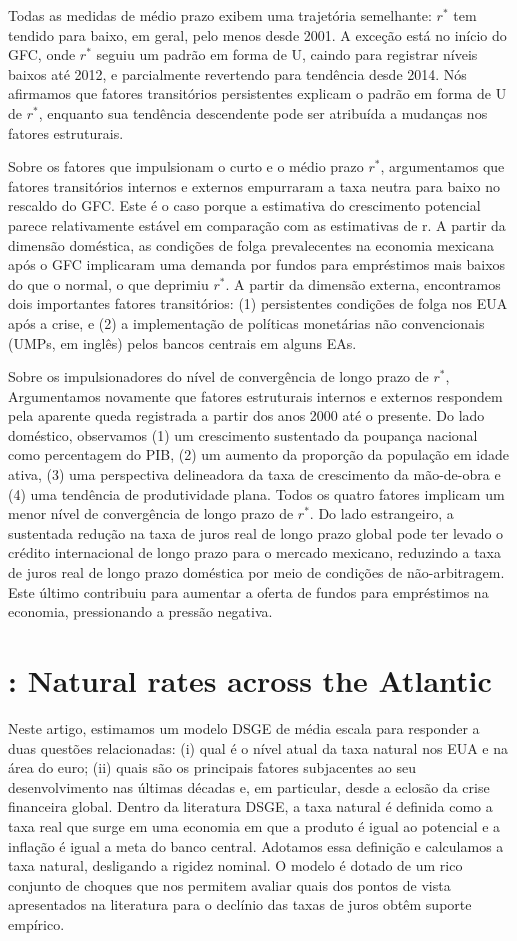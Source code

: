 Todas as medidas de médio prazo exibem uma trajetória semelhante: $r^{*}$ tem tendido para baixo, em geral, pelo menos desde 2001. A exceção está no início do GFC, onde $r^{*}$ seguiu um padrão em forma de U, caindo para registrar níveis baixos até 2012, e parcialmente revertendo para tendência desde 2014. Nós afirmamos que fatores transitórios persistentes explicam o padrão em forma de U de $r^{*}$, enquanto sua tendência descendente pode ser atribuída a mudanças nos fatores estruturais.

Sobre os fatores que impulsionam o curto e o médio prazo $r^{*}$, argumentamos que fatores transitórios internos e externos empurraram a taxa neutra para baixo no rescaldo do GFC. Este é o caso porque a estimativa do crescimento potencial parece relativamente estável em comparação com as estimativas de r. A partir da dimensão doméstica, as condições de folga prevalecentes na economia mexicana após o GFC implicaram uma demanda por fundos para empréstimos mais baixos do que o normal, o que deprimiu $r^{*}$. A partir da dimensão externa, encontramos dois importantes fatores transitórios: (1) persistentes condições de folga nos EUA após a crise, e (2) a implementação de políticas monetárias não convencionais (UMPs, em inglês) pelos bancos centrais em alguns EAs.

Sobre os impulsionadores do nível de convergência de longo prazo de $r^{*}$, Argumentamos novamente que fatores estruturais internos e externos respondem pela aparente queda registrada a partir dos anos 2000 até o presente. Do lado doméstico, observamos (1) um crescimento sustentado da poupança nacional como percentagem do PIB, (2) um aumento da proporção da população em idade ativa, (3) uma perspectiva delineadora da taxa de crescimento da mão-de-obra e (4) uma tendência de produtividade plana. Todos os quatro fatores implicam um menor nível de convergência de longo prazo de $r^{*}$. Do lado estrangeiro, a sustentada redução na taxa de juros real de longo prazo global pode ter levado o crédito internacional de longo prazo para o mercado mexicano, reduzindo a taxa de juros real de longo prazo doméstica por meio de condições de não-arbitragem. Este último contribuiu para aumentar a oferta de fundos para empréstimos na economia, pressionando a pressão negativa.
%
%
\section{\citet{Neri:2018}: Natural rates across the Atlantic }

Neste artigo, estimamos um modelo DSGE de média escala para responder a duas questões relacionadas: (i) qual é o nível atual da taxa natural nos EUA e na área do euro; (ii) quais são os principais fatores subjacentes ao seu desenvolvimento nas últimas décadas e, em particular, desde a eclosão da crise financeira global. Dentro da literatura DSGE, a taxa natural é definida como a taxa real que surge em uma economia em que a produto é igual ao potencial e a inflação é igual a meta do banco central. Adotamos essa definição e calculamos a taxa natural, desligando a rigidez nominal. O modelo é dotado de um rico conjunto de choques que nos permitem avaliar quais dos pontos de vista apresentados na literatura para o declínio das taxas de juros obtêm suporte empírico.

